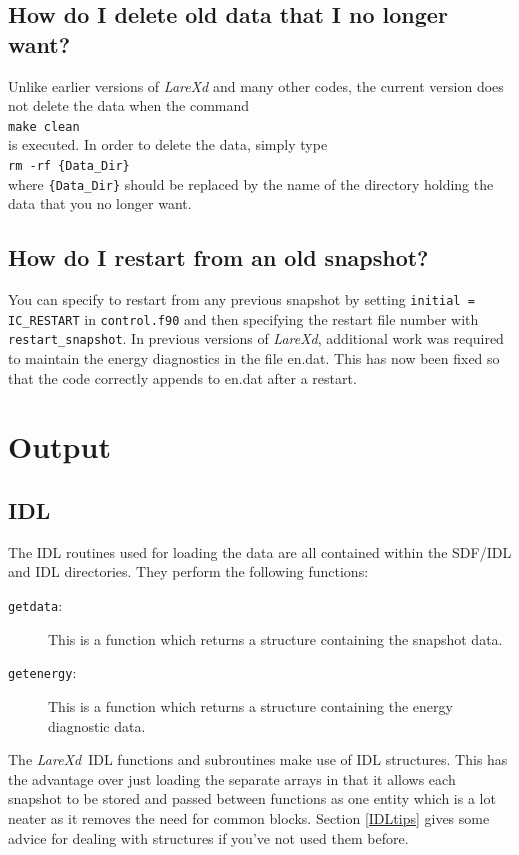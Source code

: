 \documentclass[11pt]{article}
\newcommand{\lare}{{\it LareXd}\ }
\begin{document}
\subsection*{How do I delete old data that I no longer want?}
Unlike earlier versions of {\it LareXd} and many other codes, the current
version does not delete the data when the command\\
\texttt{make clean}\\
is executed. In order to delete the data, simply type\\
\texttt{rm -rf \{Data\_Dir\}}\\
where \texttt{\{Data\_Dir\}} should be replaced by the name of the directory
holding the data that you no longer want.
\subsection*{How do I restart from an old snapshot?}
You can specify to restart from any previous snapshot by setting \texttt{initial = IC\_RESTART} in
\texttt{control.f90} and then specifying the restart file number with \texttt{restart\_snapshot}. In previous versions of {\it LareXd}, additional work was required to maintain the energy diagnostics in the file en.dat. This has now been fixed so that the code correctly appends to en.dat after a restart.


\section{Output}
\subsection{IDL}
The IDL routines used for loading the data are all contained within the SDF/IDL and IDL directories. They perform the following functions:
\begin{description}
\item[\texttt{getdata}:] This is a function which returns a structure containing the snapshot data.
\item[\texttt{getenergy}:]  This is a function which returns a structure containing the energy diagnostic data.
\end{description}

The \lare IDL functions and subroutines make use of IDL structures. This has the advantage over just loading the separate arrays in that it allows each snapshot to be stored and passed between functions as one entity which is a lot neater as it removes the need for common blocks. Section \ref{IDLtips} gives some advice for dealing with structures if you've not used them before.
\end{document}
